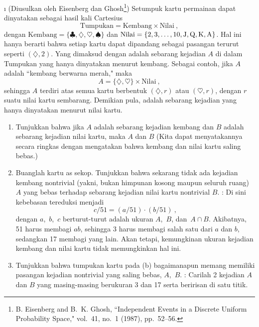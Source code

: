 \begin{LJSItem}
\i\label{exer 4.1.38} (Diusulkan oleh Eisenberg dan Ghosh\footnote{B. Eisenberg and B.~K. Ghosh, ``Independent Events in a Discrete
Uniform Probability Space,"  vol.~41, no.~1 (1987),
pp.~52--56.})  Setumpuk kartu permainan dapat dinyatakan sebagai hasil kali Cartesius
$$
\mbox{Tumpukan} =  \mbox{Kembang} \times \mbox{Nilai}\ ,
$$
dengan $\mbox{Kembang} = \{\clubsuit,\diamondsuit,\heartsuit,\spadesuit\}$ dan %
$\mbox{Nilai} = \{2,3,\dots,10,{\mbox J},{\mbox Q},{\mbox K},{\mbox A}\}$.  Hal ini
hanya berarti bahwa setiap kartu dapat dipandang sebagai pasangan terurut seperti
$(\diamondsuit,2)$.  Yang dimaksud dengan  adalah sebarang kejadian $A$ di dalam
Tumpukan yang hanya dinyatakan menurut kembang.  Sebagai contoh, jika $A$ adalah ``kembang
berwarna merah," maka
$$
A = \{\diamondsuit,\heartsuit\} \times \mbox{Nilai}\ ,
$$
sehingga $A$ terdiri atas semua kartu berbentuk $(\diamondsuit,r)$ atau
$(\heartsuit,r)$, dengan $r$ suatu nilai kartu sembarang.  Demikian pula,  adalah sebarang
kejadian yang hanya dinyatakan menurut nilai kartu.
\begin{enumerate}
\item Tunjukkan bahwa jika $A$ adalah sebarang kejadian kembang dan $B$ adalah sebarang kejadian nilai kartu, maka $A$
dan $B$   (Kita dapat menyatakannya secara ringkas dengan mengatakan bahwa
kembang dan nilai kartu saling bebas.)

\item Buanglah kartu as sekop.  Tunjukkan bahwa sekarang tidak ada kejadian kembang nontrivial (yakni,
bukan himpunan kosong maupun seluruh ruang) $A$ yang bebas terhadap sebarang
kejadian nilai kartu nontrivial $B$.  : Di sini kebebasan tereduksi menjadi
$$
c/51 = (a/51) \cdot (b/51)\ ,
$$
dengan $a$,~$b$,~$c$ berturut-turut adalah ukuran $A$,~$B$, dan~$A \cap B$.  Akibatnya,
51 harus membagi $ab$, sehingga 3 harus membagi salah satu dari $a$ dan $b$,
sedangkan 17 membagi yang lain.  Akan tetapi, kemungkinan ukuran kejadian kembang dan nilai kartu tidak memungkinkan
hal ini.

\item Tunjukkan bahwa tumpukan kartu pada (b) bagaimanapun memang memiliki
pasangan kejadian nontrivial yang saling bebas, $A$,~$B$.  : Carilah 2 kejadian
$A$ dan $B$ yang masing-masing berukuran 3 dan 17 serta beririsan di satu titik.


\end{enumerate}
\end{LJSItem}

